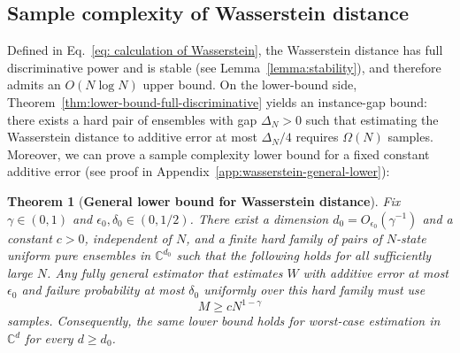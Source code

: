 \documentclass[aps,prx,reprint,superscriptaddress,amsmath,amssymb,longbibliography,floatfix]{revtex4-2}
\newcommand{\QZ}[1]{{\textcolor{blue}{#1}}}
\newcommand{\JY}[1]{{\textcolor{orange}{#1}}}
\theoremstyle{plain}
\newtheorem{theorem}{Theorem}[section]
\theoremstyle{definition}
\theoremstyle{remark}
\begin{document}

\subsection{Sample complexity of Wasserstein distance}
Defined in Eq.~\eqref{eq: calculation of Wasserstein}, the Wasserstein distance has full discriminative power and is stable (see Lemma~\ref{lemma:stability}), and therefore admits an \(O(N\log N)\) upper bound. On the lower-bound side, Theorem~\ref{thm:lower-bound-full-discriminative} yields an instance-gap bound: there exists a hard pair of ensembles with gap \(\Delta_N>0\) such that estimating the Wasserstein distance to additive error at most \(\Delta_N/4\) requires \(\Omega(N)\) samples. Moreover, we can prove a sample complexity lower bound for a fixed constant additive error (see proof in Appendix~\ref{app:wasserstein-general-lower}):
\begin{theorem}[\textbf{General lower bound for Wasserstein distance}]
\label{thm:wasserstein-general-lower}
Fix $\gamma\in(0,1)$ and $\epsilon_0,\delta_0\in(0,1/2)$. There exist a dimension $d_0=O_{\epsilon_0}(\gamma^{-1})$ and a constant $c>0$, independent of $N$, and a finite hard family of pairs of $N$-state uniform pure ensembles in $\mathbb C^{d_0}$ such that the following holds for all sufficiently large $N$. Any fully general estimator that estimates $W$ with additive error at most $\epsilon_0$ and failure probability at most $\delta_0$ uniformly over this hard family must use
\[
M\ge cN^{1-\gamma}
\]
samples. Consequently, the same lower bound holds for worst-case estimation in $\mathbb C^d$ for every $d\ge d_0$.
\end{theorem}




\end{document}

